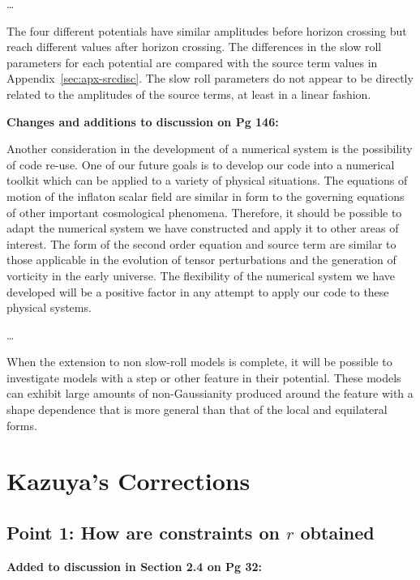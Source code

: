 \ldots

The four different potentials have similar amplitudes before horizon crossing but reach different
values after horizon crossing. The differences in the slow roll parameters for each potential are
compared with the source term values in Appendix~\ref{sec:apx-srcdisc}. The slow roll parameters
do not appear to be directly related to the amplitudes of the source terms, at least in a linear
fashion.


\textbf{Changes and additions to discussion on Pg 146:}


Another consideration in the development of a numerical system is the possibility of
code re-use. One of our future goals is to develop our code into a numerical toolkit which
can be applied to a variety of physical situations.
The equations of motion of the inflaton scalar field are similar in form
to the governing equations of other important cosmological phenomena. Therefore, it
should be possible to adapt the numerical system we have constructed and apply it to
other areas of interest. The form of the second order equation and source term are similar to those
applicable in the evolution of tensor perturbations and the
generation of vorticity in the early universe. The flexibility of the numerical system we have
developed will be a positive factor in any attempt to apply our code to these physical systems. 

\ldots

When the extension to non slow-roll models
is complete, it will be possible to investigate models with a step or other feature in their
potential. These models can exhibit large amounts of non-Gaussianity produced around the feature
with a shape dependence that is more general than that of the local and equilateral forms.



\section{Kazuya's Corrections}
\subsection{Point 1: How are constraints on \texorpdfstring{$r$}{r} obtained}
\textbf{Added to discussion in Section 2.4 on Pg 32:}

